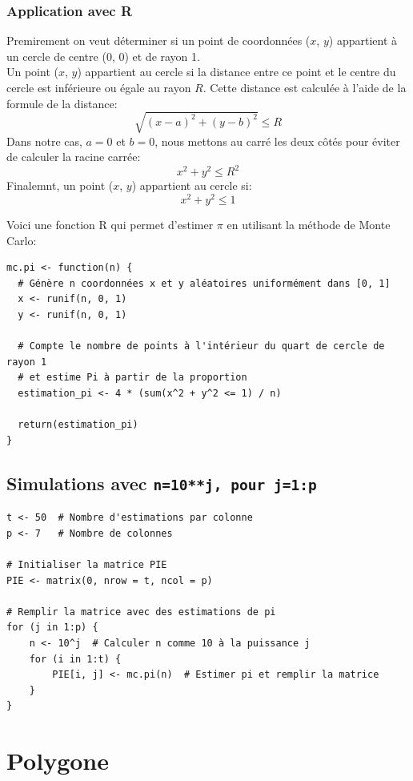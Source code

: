 \documentclass[a4paper,12pt]{article}
\begin{document}
\subsubsection{Application avec R}

Premirement on veut déterminer si un point de coordonnées ($x$, $y$) appartient à un cercle de centre (0, 0) et de rayon 1.
\\[1\baselineskip]
Un point ($x$, $y$) appartient au cercle si la distance entre ce point et le centre du cercle est inférieure ou égale au rayon $R$. Cette distance est calculée à l'aide de la formule de la distance:
\[
\sqrt{(x - a)^2 + (y - b)^2} \leq R
\]
Dans notre cas, $a = 0$ et $b = 0$, nous mettons au carré les deux côtés pour éviter de calculer la racine carrée:
\[
x^2 + y^2 \leq R^2
\]
Finalemnt, un point ($x$, $y$) appartient au cercle si:
\[
x^2 + y^2 \leq 1
\]

\newpage

Voici une fonction R qui permet d'estimer $\pi$ en utilisant la méthode de Monte Carlo:

\begin{lstlisting}
mc.pi <- function(n) {
  # Génère n coordonnées x et y aléatoires uniformément dans [0, 1]
  x <- runif(n, 0, 1)
  y <- runif(n, 0, 1)
  
  # Compte le nombre de points à l'intérieur du quart de cercle de rayon 1
  # et estime Pi à partir de la proportion
  estimation_pi <- 4 * (sum(x^2 + y^2 <= 1) / n)
  
  return(estimation_pi) 
}
\end{lstlisting}

\subsection{Simulations avec \texttt{n=10**j, pour j=1:p} }


\begin{lstlisting}
t <- 50  # Nombre d'estimations par colonne
p <- 7   # Nombre de colonnes

# Initialiser la matrice PIE
PIE <- matrix(0, nrow = t, ncol = p)

# Remplir la matrice avec des estimations de pi
for (j in 1:p) {
    n <- 10^j  # Calculer n comme 10 à la puissance j
    for (i in 1:t) {
        PIE[i, j] <- mc.pi(n)  # Estimer pi et remplir la matrice
    }
}
\end{lstlisting}

\section{Polygone}
\end{document}
